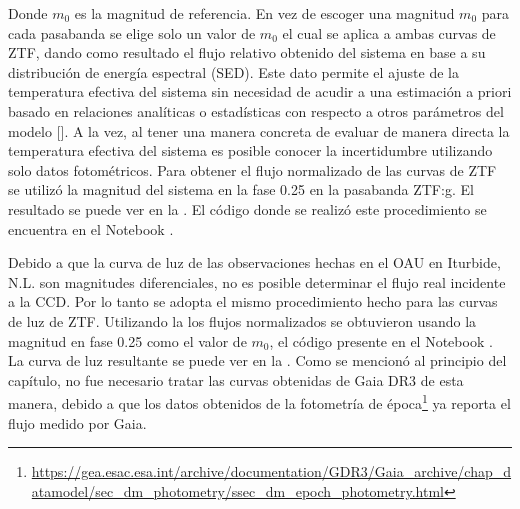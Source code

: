 Donde $m_0$ es la magnitud de referencia. En vez de escoger una magnitud $m_0$
para cada pasabanda se elige solo un valor de $m_0$ el cual se aplica a ambas
curvas de ZTF, dando como resultado el flujo relativo obtenido del sistema en
base a su distribución de energía espectral (SED). Este dato permite el ajuste
de la temperatura efectiva del sistema sin necesidad de acudir a una estimación
a priori basado en relaciones analíticas o estadísticas con respecto a otros
parámetros del modelo
[]. A la
vez, al tener una manera concreta de evaluar de manera directa la temperatura
efectiva del sistema es posible conocer la incertidumbre utilizando solo datos
fotométricos. Para obtener el flujo normalizado de las curvas de ZTF se utilizó
la magnitud del sistema en la fase 0.25 en la pasabanda ZTF:g. El resultado se
puede ver en la . El código donde se realizó
este procedimiento se encuentra en el Notebook
\href{https://github.com/KnightIV/UANL_MAPTA_Observaciones/blob/main/analisis/ztf/light-curve-processing.ipynb}{}.

Debido a que la curva de luz de las observaciones hechas en el OAU en Iturbide,
N.L. son magnitudes diferenciales, no es posible determinar el flujo real
incidente a la CCD. Por lo tanto se adopta el mismo procedimiento hecho para las
curvas de luz de ZTF. Utilizando la  los
flujos normalizados se obtuvieron usando la magnitud en fase 0.25 como el valor
de $m_0$, el código presente en el Notebook
\href{https://github.com/KnightIV/UANL_MAPTA_Observaciones/blob/main/analisis/period-analysis/periodogram.ipynb}{}.
La curva de luz resultante se puede ver en la
. Como se mencionó al principio del capítulo,
no fue necesario tratar las curvas obtenidas de Gaia DR3 de esta manera, debido
a que los datos obtenidos de la fotometría de
época\footnote{\url{https://gea.esac.esa.int/archive/documentation/GDR3/Gaia_archive/chap_datamodel/sec_dm_photometry/ssec_dm_epoch_photometry.html}}
ya reporta el flujo medido por Gaia. 

